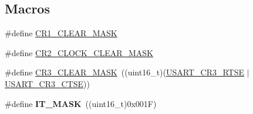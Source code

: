 \subsection*{Macros}
\begin{DoxyCompactItemize}
\item 
\#define \hyperlink{group___u_s_a_r_t_ga8d425258898b4af4ebc820f52635fad8}{C\+R1\+\_\+\+C\+L\+E\+A\+R\+\_\+\+M\+A\+SK}
\item 
\#define \hyperlink{group___u_s_a_r_t_ga7834b3d9be4875de242f87c12fd79f02}{C\+R2\+\_\+\+C\+L\+O\+C\+K\+\_\+\+C\+L\+E\+A\+R\+\_\+\+M\+A\+SK}
\item 
\#define \hyperlink{group___u_s_a_r_t_ga5c882571db73abc5d1837368a1cb0a64}{C\+R3\+\_\+\+C\+L\+E\+A\+R\+\_\+\+M\+A\+SK}~((uint16\+\_\+t)(\hyperlink{group___peripheral___registers___bits___definition_ga7c5d6fcd84a4728cda578a0339b4cac2}{U\+S\+A\+R\+T\+\_\+\+C\+R3\+\_\+\+R\+T\+SE} $\vert$ \hyperlink{group___peripheral___registers___bits___definition_gaa125f026b1ca2d76eab48b191baed265}{U\+S\+A\+R\+T\+\_\+\+C\+R3\+\_\+\+C\+T\+SE}))
\item 
\#define {\bfseries I\+T\+\_\+\+M\+A\+SK}~((uint16\+\_\+t)0x001\+F)\hypertarget{group___u_s_a_r_t_gacde7fc0e46b3a5fc7e2002b2915884d5}{}\label{group___u_s_a_r_t_gacde7fc0e46b3a5fc7e2002b2915884d5}

\end{DoxyCompactItemize}
